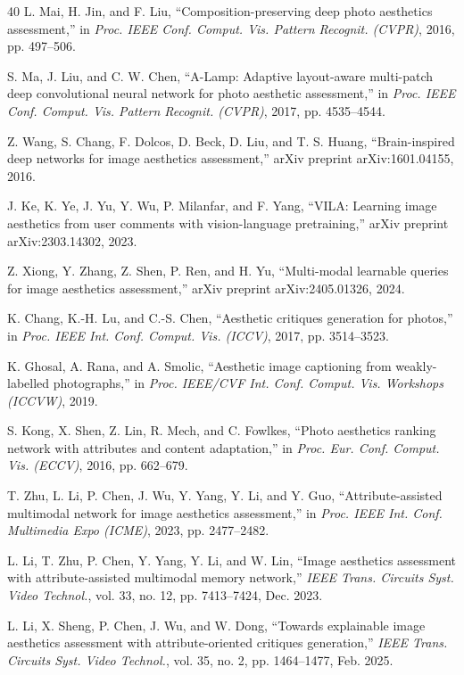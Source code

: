 \documentclass[journal]{IEEEtran}
\begin{document}
\begin{thebibliography}{40}
L. Mai, H. Jin, and F. Liu, ``Composition-preserving deep photo aesthetics assessment,'' in \emph{Proc. IEEE Conf. Comput. Vis. Pattern Recognit. (CVPR)}, 2016, pp. 497--506.

S. Ma, J. Liu, and C. W. Chen, ``A-Lamp: Adaptive layout-aware multi-patch deep convolutional neural network for photo aesthetic assessment,'' in \emph{Proc. IEEE Conf. Comput. Vis. Pattern Recognit. (CVPR)}, 2017, pp. 4535--4544.

Z. Wang, S. Chang, F. Dolcos, D. Beck, D. Liu, and T. S. Huang, ``Brain-inspired deep networks for image aesthetics assessment,'' arXiv preprint arXiv:1601.04155, 2016.

J. Ke, K. Ye, J. Yu, Y. Wu, P. Milanfar, and F. Yang, ``VILA: Learning image aesthetics from user comments with vision-language pretraining,'' arXiv preprint arXiv:2303.14302, 2023.

Z. Xiong, Y. Zhang, Z. Shen, P. Ren, and H. Yu, ``Multi-modal learnable queries for image aesthetics assessment,'' arXiv preprint arXiv:2405.01326, 2024.

K. Chang, K.-H. Lu, and C.-S. Chen, ``Aesthetic critiques generation for photos,'' in \emph{Proc. IEEE Int. Conf. Comput. Vis. (ICCV)}, 2017, pp. 3514--3523.

K. Ghosal, A. Rana, and A. Smolic, ``Aesthetic image captioning from weakly-labelled photographs,'' in \emph{Proc. IEEE/CVF Int. Conf. Comput. Vis. Workshops (ICCVW)}, 2019.

S. Kong, X. Shen, Z. Lin, R. Mech, and C. Fowlkes, ``Photo aesthetics ranking network with attributes and content adaptation,'' in \emph{Proc. Eur. Conf. Comput. Vis. (ECCV)}, 2016, pp. 662--679.

T. Zhu, L. Li, P. Chen, J. Wu, Y. Yang, Y. Li, and Y. Guo, ``Attribute-assisted multimodal network for image aesthetics assessment,'' in \emph{Proc. IEEE Int. Conf. Multimedia Expo (ICME)}, 2023, pp. 2477--2482.

L. Li, T. Zhu, P. Chen, Y. Yang, Y. Li, and W. Lin, ``Image aesthetics assessment with attribute-assisted multimodal memory network,'' \emph{IEEE Trans. Circuits Syst. Video Technol.}, vol. 33, no. 12, pp. 7413--7424, Dec. 2023.

L. Li, X. Sheng, P. Chen, J. Wu, and W. Dong, ``Towards explainable image aesthetics assessment with attribute-oriented critiques generation,'' \emph{IEEE Trans. Circuits Syst. Video Technol.}, vol. 35, no. 2, pp. 1464--1477, Feb. 2025.


\end{thebibliography}
\end{document}
